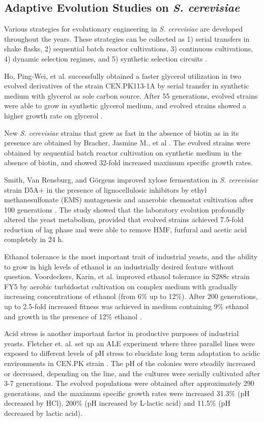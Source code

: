 \subsection{Adaptive Evolution Studies on \emph{S. cerevisiae}}

Various strategies for evolutionary engineering in \emph{S. cerevisiae} are developed throughout the years. These strategies can be collected as 1) serial transfers in shake flasks, 2) sequential batch reactor cultivations, 3) continuous cultivations, 4) dynamic selection regimes, and 5) synthetic selection circuits \cite{mans2018under}.

Ho, Ping-Wei, et al. successfully obtained a faster glycerol utilization in two evolved derivatives of the strain CEN.PK113-1A by serial transfer in synthetic medium with glycerol as sole carbon source. After 55 generations, evolved strains were able to grow in synthetic glycerol medium, and evolved strains showed a higher growth rate on glycerol \cite{ho2017sole}.

New \emph{S. cerevisiae} strains that grew as fast in the absence of biotin as in its presence are obtained by Bracher, Jasmine M., et al \cite{bracher2017laboratory}. The evolved strains were obtained by sequential batch reactor cultivation on synthetic medium in the absence of biotin, and showed 32-fold increased maximum specific growth rates.

Smith, Van Rensburg, and Görgens improved xylose fermentation in \emph{S. cerevisiae} strain D5A+ in the presence of lignocellulosic inhibitors by ethyl methanesulfonate (EMS) mutagenesis and anaerobic chemostat cultivation after 100  generations \cite{smith2014simultaneously}. The study showed that the laboratory evolution profoundly altered the yeast metabolism, provided that evolved strains achieved 7.5-fold reduction of lag phase and were able to remove HMF, furfural and acetic acid completely in 24 h.

Ethanol tolerance is the most important trait of industrial yeasts, and the ability to grow in high levels of ethanol is an industrially desired feature without question. Voordeckers, Karin, et al. improved ethanol tolerance in S288c strain FY5 by aerobic turbidostat cultivation on complex medium with gradually increasing concentrations of ethanol (from 6\% up to 12\%). After 200 generations, up to 2.5-fold increased fitness was achieved in medium containing 9\% ethanol and growth in the presence of 12\% ethanol \cite{voordeckers2015adaptation}.

Acid stress is another important factor in productive purposes of industrial yeasts. Fletcher et. al. set up an ALE experiment where three parallel lines were exposed to different levels of pH stress to elucidate long term adaptation to acidic environments in CEN.PK strain \cite{fletcher2017evolutionary}. The pH of the colonies were steadily increased or decreased, depending on the line, and the cultures were serially cultivated after 3-7 generations. The evolved populations were obtained after approximately 290 generations, and the maximum specific growth rates were increased 31.3\% (pH decreased by HCl), 200\% (pH increased by L-lactic acid) and 11.5\% (pH decreased by lactic acid).

